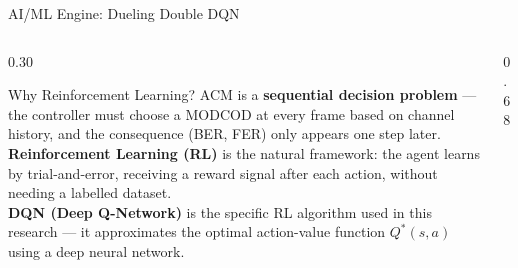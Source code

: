 \documentclass[aspectratio=169,10pt]{beamer}
\begin{document}
\begin{frame}[shrink=10,fragile]{AI/ML Engine: Dueling Double DQN}
\begin{columns}[T]
  \begin{column}{0.30\textwidth}
    \begin{alertblock}{Why Reinforcement Learning?}
      \small
      ACM is a \textbf{sequential decision problem} — the controller must
      choose a MODCOD at every frame based on channel history, and the
      consequence (BER, FER) only appears one step later.\\[0.4em]
      \textbf{Reinforcement Learning (RL)} is the natural framework:
      the agent learns by trial-and-error, receiving a reward signal
      after each action, without needing a labelled dataset.\\[0.4em]
      \textbf{DQN (Deep Q-Network)} is the specific RL algorithm used
      in this research — it approximates the optimal action-value
      function $Q^*(s,a)$ using a deep neural network.
    \end{alertblock}
  \end{column}
  \begin{column}{0.68\textwidth}
    \begin{center}
\end{center}
\end{column}
\end{columns}
\end{frame}
\end{document}
